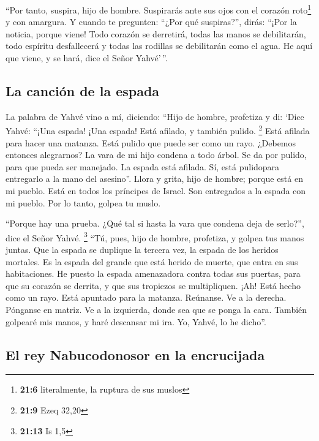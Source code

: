  ``Por tanto, suspira, hijo de hombre. Suspirarás ante sus
ojos con el corazón roto\footnote{\textbf{21:6} literalmente, la ruptura
  de sus muslos} y con amargura.  Y cuando te pregunten:
``¿Por qué suspiras?'', dirás: ``¡Por la noticia, porque viene! Todo
corazón se derretirá, todas las manos se debilitarán, todo espíritu
desfallecerá y todas las rodillas se debilitarán como el agua. He aquí
que viene, y se hará, dice el Señor Yahvé'\,''.

\hypertarget{la-canciuxf3n-de-la-espada}{%
\subsection{La canción de la espada}\label{la-canciuxf3n-de-la-espada}}

 La palabra de Yahvé vino a mí, diciendo: 
``Hijo de hombre, profetiza y di: `Dice Yahvé: ``¡Una espada! ¡Una
espada! Está afilado, y también pulido. \footnote{\textbf{21:9} Ezeq
  32,20}  Está afilada para hacer una matanza. Está
pulido que puede ser como un rayo. ¿Debemos entonces alegrarnos? La vara
de mi hijo condena a todo árbol.  Se da por pulido, para
que pueda ser manejado. La espada está afilada. Sí, está pulidopara
entregarlo a la mano del asesino''.  Llora y grita, hijo
de hombre; porque está en mi pueblo. Está en todos los príncipes de
Israel. Son entregados a la espada con mi pueblo. Por lo tanto, golpea
tu muslo.

 ``Porque hay una prueba. ¿Qué tal si hasta la vara que
condena deja de serlo?'', dice el Señor Yahvé. \footnote{\textbf{21:13}
  Is 1,5}  ``Tú, pues, hijo de hombre, profetiza, y
golpea tus manos juntas. Que la espada se duplique la tercera vez, la
espada de los heridos mortales. Es la espada del grande que está herido
de muerte, que entra en sus habitaciones.  He puesto la
espada amenazadora contra todas sus puertas, para que su corazón se
derrita, y que sus tropiezos se multipliquen. ¡Ah! Está hecho como un
rayo. Está apuntado para la matanza.  Reúnanse. Ve a la
derecha. Pónganse en matriz. Ve a la izquierda, donde sea que se ponga
la cara.  También golpearé mis manos, y haré descansar mi
ira. Yo, Yahvé, lo he dicho''.

\hypertarget{el-rey-nabucodonosor-en-la-encrucijada}{%
\subsection{El rey Nabucodonosor en la
encrucijada}\label{el-rey-nabucodonosor-en-la-encrucijada}}

